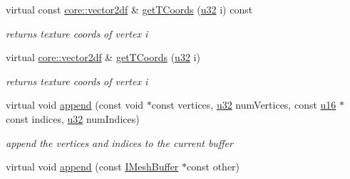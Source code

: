 \begin{DoxyCompactItemize}
\mbox{\label{structirr_1_1scene_1_1SSkinMeshBuffer_a95a35014fd0c9c18de65e1ff2e09b89b}} 
virtual const \hyperlink{namespaceirr_1_1core_a116f90bd31515724b6235014ee2b74d5}{core\+::vector2df} \& \hyperlink{structirr_1_1scene_1_1SSkinMeshBuffer_a95a35014fd0c9c18de65e1ff2e09b89b}{get\+T\+Coords} (\hyperlink{namespaceirr_a0416a53257075833e7002efd0a18e804}{u32} i) const
\begin{DoxyCompactList}\small\item\em returns texture coords of vertex i \end{DoxyCompactList}\item 
\mbox{\label{structirr_1_1scene_1_1SSkinMeshBuffer_ac2995b2452443d6bcad0a940e8218c3e}} 
virtual \hyperlink{namespaceirr_1_1core_a116f90bd31515724b6235014ee2b74d5}{core\+::vector2df} \& \hyperlink{structirr_1_1scene_1_1SSkinMeshBuffer_ac2995b2452443d6bcad0a940e8218c3e}{get\+T\+Coords} (\hyperlink{namespaceirr_a0416a53257075833e7002efd0a18e804}{u32} i)
\begin{DoxyCompactList}\small\item\em returns texture coords of vertex i \end{DoxyCompactList}\item 
\mbox{\label{structirr_1_1scene_1_1SSkinMeshBuffer_aded60392b4d793804bbf417c6bafa5f9}} 
virtual void \hyperlink{structirr_1_1scene_1_1SSkinMeshBuffer_aded60392b4d793804bbf417c6bafa5f9}{append} (const void $\ast$const vertices, \hyperlink{namespaceirr_a0416a53257075833e7002efd0a18e804}{u32} num\+Vertices, const \hyperlink{namespaceirr_ae9f8ec82692ad3b83c21f555bfa70bcc}{u16} $\ast$const indices, \hyperlink{namespaceirr_a0416a53257075833e7002efd0a18e804}{u32} num\+Indices)
\begin{DoxyCompactList}\small\item\em append the vertices and indices to the current buffer \end{DoxyCompactList}\item 
\mbox{\label{structirr_1_1scene_1_1SSkinMeshBuffer_a5395bc06c4c6b1c9a82dbdd56916a9e0}} 
virtual void \hyperlink{structirr_1_1scene_1_1SSkinMeshBuffer_a5395bc06c4c6b1c9a82dbdd56916a9e0}{append} (const \hyperlink{classirr_1_1scene_1_1IMeshBuffer}{I\+Mesh\+Buffer} $\ast$const other)

\end{DoxyCompactItemize}
